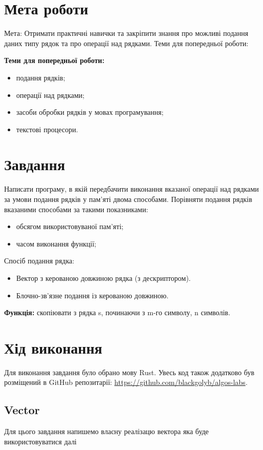 \section{Мета роботи}
Мета: Отримати практичні навички та закріпити знання про можливі
подання даних типу рядок та про операції над рядками.
Теми для попередньої роботи:

\noindent
\textbf{Теми для попередньої роботи:}
\begin{itemize}
    \item подання рядків;
    \item операції над рядками;
    \item засоби обробки рядків у мовах програмування;
    \item текстові процесори.
\end{itemize}



\section{Завдання}
Написати програму, в якій передбачити виконання вказаної операції
над рядками за умови подання рядків у пам’яті двома способами.
Порівняти подання рядків вказаними способами за такими показниками:
\begin{itemize}
    \item обсягом використовуваної пам’яті;
    \item часом виконання функції;
\end{itemize}

\noindent
Спосіб подання рядка:
\begin{itemize}
    \item Вектор з керованою довжиною рядка (з дескриптором).
    \item Блочно-зв’язне подання із керованою довжиною.
\end{itemize}

\noindent
\textbf{Функція: }скопіювати з рядка s, починаючи з m-го символу, n символів.



\section{Хід виконання}
Для виконання завдання було обрано мову Rust.
Увесь код також додатково був розміщений в GitHub репозитарії: \href{https://github.com/blackgolyb/algos-labs}{https://github.com/blackgolyb/algos-labs}.


\newpage
\subsection{Vector}
Для цього завдання напишемо власну реалізацю вектора яка буде використовуватися далі



